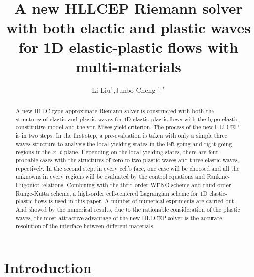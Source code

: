 \documentclass{article}
\numberwithin{equation}{section}
\numberwithin{table}{section}
\begin{document}
\title{A new HLLCEP Riemann solver with both elactic and plastic waves for 1D  elastic-plastic flows with multi-materials }
\author{Li Liu$^1$,Junbo Cheng $^{1,*}$}

\maketitle

\address{$^1$  Institute of Applied Physics and Computational Mathematics, Beijing 100094, China }

\begin{abstract}

  A new  HLLC-type  approximate Riemann solver is constructed with both the structures of elastic and plastic waves for 1D elastic-plastic flows with the hypo-elastic constitutive model and the von Mises yield criterion. The process of the new HLLCEP is in two steps. In the first step, a pre-evaluation is taken with only a  simple three waves structure to analysis the local yielding states in the left going  and right going regions in the $x$ -$t$ plane. Depending on the local yielding states, there are four probable cases with the structures of zero to two plastic waves and three elastic waves, repectively. In the second step,  in every cell's face, one case will be  choosed and all the unknowns in every regions will be evaluated by the control equations and Rankine-Hugoniot relations.  Combining with the third-order WENO scheme and third-order Runge-Kutta scheme, a high-order cell-centered Lagrangian scheme for 1D elastic-plastic flows is used in this paper. A number of numerical expriments are carried out.  And showed by the numerical results, due to the rationable  consideration  of the plastic waves, the most attractive advantage of the new HLLCEP solver is the accurate resolution of the interface between different materials.  
\end{abstract}

\section{Introduction}
\end{document}
